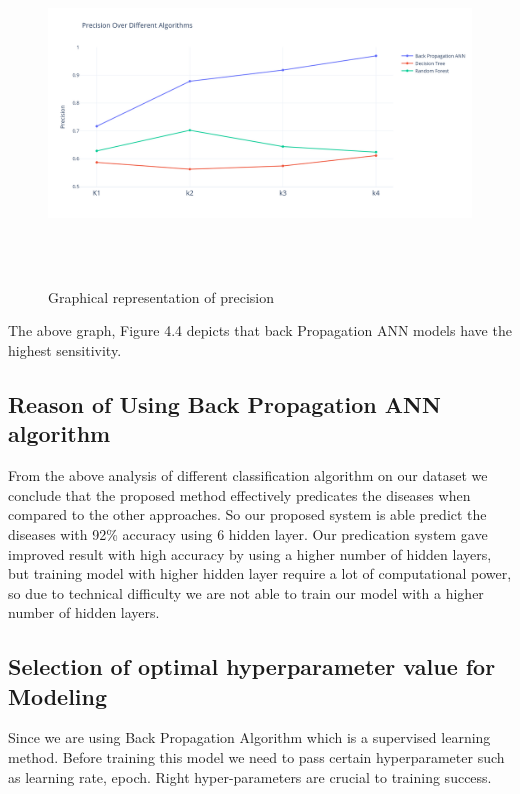 \begin{figure}[H]
\begin{center}
\includegraphics[width=150mm,height=90mm]{comparisonnew/precision.png}
 \caption{Graphical representation of precision}
 \end{center}                
\end{figure}

The  above  graph, Figure 4.4 depicts that back Propagation ANN  models  have the highest sensitivity.\newline

\subsection{Reason of Using Back Propagation ANN algorithm}

 From the above analysis of different classification algorithm on our dataset we conclude  that the proposed method effectively predicates the diseases when compared to the other approaches. So our proposed system is able predict the diseases with 92\% accuracy using 6 hidden layer. Our predication system gave improved result with high accuracy by using a higher number of hidden layers, but training model with higher hidden layer require a lot of computational power, so due to technical difficulty we are not able to train our model with a higher number of hidden layers.

\subsection{Selection of optimal  hyperparameter value for Modeling}

Since we are using Back Propagation Algorithm which is a supervised learning method. Before training this model we need to pass certain hyperparameter such as learning rate, epoch. Right hyper-parameters are crucial to training success.

